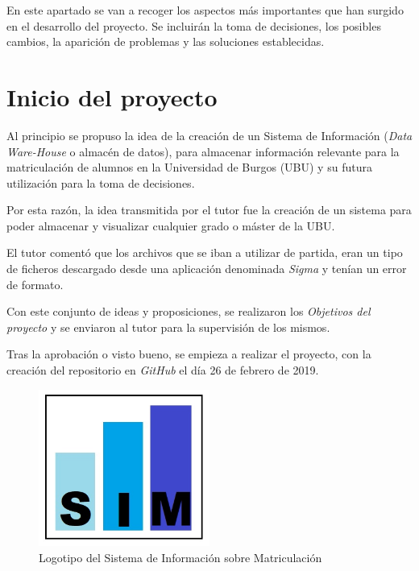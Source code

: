 
En este apartado se van a recoger los aspectos más importantes que han surgido en el desarrollo del proyecto. Se incluirán la toma de decisiones, los posibles cambios, la aparición de problemas y las soluciones establecidas.

\section{Inicio del proyecto}\label{inicio_del_proyecto}

Al principio se propuso la idea de la creación de un Sistema de Información (\emph{Data Ware-House} o almacén de datos), para almacenar información relevante para la matriculación de alumnos en la Universidad de Burgos (UBU) y su futura utilización para la toma de decisiones.

Por esta razón, la idea transmitida por el tutor fue la creación de un sistema para poder almacenar y visualizar cualquier grado o máster de la UBU.

El tutor comentó que los archivos que se iban a utilizar de partida, eran un tipo de ficheros descargado desde una aplicación denominada \emph{Sigma} y tenían un error de formato.

Con este conjunto de ideas y proposiciones, se realizaron los \emph{Objetivos del proyecto} y se enviaron al tutor para la supervisión de los mismos.

Tras la aprobación o visto bueno, se empieza a realizar el proyecto, con la creación del repositorio en \emph{GitHub} el día 26 de febrero de 2019.


\begin{figure}%
		\centering
		\includegraphics[width=0.5\textwidth]{logo}
		\caption{Logotipo del Sistema de Información sobre Matriculación}\label{fig:logo}
\end{figure}

